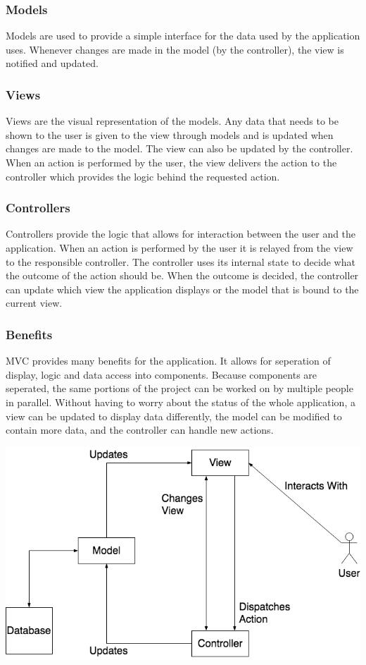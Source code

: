\documentclass[12pt]{article}
\begin{document}
\subsubsection{Models}

Models are used to provide a simple interface for the data used by the application uses.
Whenever changes are made in the model (by the controller), the view is notified and updated.

\subsubsection{Views}

Views are the visual representation of the models. Any data that needs to be shown to the user is
given to the view through models and is updated when changes are made to the model.
The view can also be updated by the controller. When an action is performed by the user,
the view delivers the action to the controller which provides the logic behind the requested
action.

\subsubsection{Controllers}

Controllers provide the logic that allows for interaction between the user and the application.
When an action is performed by the user it is relayed from the view to the responsible controller.
The controller uses its internal state to decide what the outcome of the action should be.
When the outcome is decided, the controller can update which view the application displays
or the model that is bound to the current view.

\subsubsection{Benefits}

MVC provides many benefits for the application. It allows for seperation of display, logic and 
data access into components. Because components are seperated, the same portions of the project
can be worked on by multiple people in parallel. Without having to worry about the status of the whole
application, a view can be updated to display data differently, 
the model can be modified to contain more data, and the controller can
handle new actions.


\includegraphics[scale=0.7]{archdesigndiagram}\\
\end{document}
